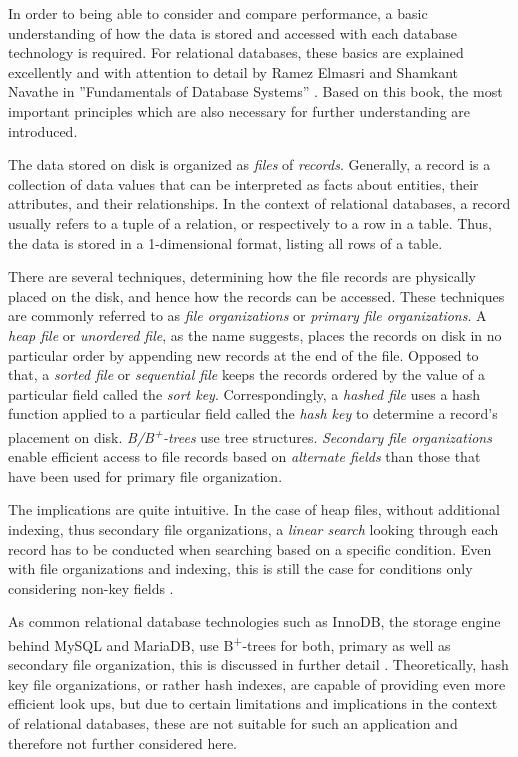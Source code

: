 In order to being able to consider and compare performance, a basic understanding of how the data is stored and accessed with each database technology is required. For relational databases, these basics are explained excellently and with attention to detail by Ramez Elmasri and Shamkant Navathe in ''Fundamentals of Database Systems'' \cite{DatabaseFundamentals}. Based on this book, the most important principles which are also necessary for further understanding are introduced.\par
The data stored on disk is organized as \emph{files} of \emph{records}. Generally, a record is a collection of data values that can be interpreted as facts about entities, their attributes, and their relationships. In the context of relational databases, a record usually refers to a tuple of a relation, or respectively to a row in a table. Thus, the data is stored in a 1-dimensional format, listing all rows of a table.\par
There are several techniques, determining how the file records are physically placed on the disk, and hence how the records can be accessed. These techniques are commonly referred to as \emph{file organizations} or \emph{primary file organizations}. A \emph{heap file} or \emph{unordered file}, as the name suggests, places the records on disk in no particular order by appending new records at the end of the file. Opposed to that, a \emph{sorted file} or \emph{sequential file} keeps the records ordered by the value of a particular field called the \emph{sort key}. Correspondingly, a \emph{hashed file} uses a hash function applied to a particular field called the \emph{hash key} to determine a record's placement on disk. \emph{B/B\textsuperscript{+}-trees} use tree structures. \emph{Secondary file organizations} enable efficient access to file records based on \emph{alternate fields} than those that have been used for primary file organization.\par
The implications are quite intuitive. In the case of heap files, without additional indexing, thus secondary file organizations, a \emph{linear search} looking through each record has to be conducted when searching based on a specific condition. Even with file organizations and indexing, this is still the case for conditions only considering non-key fields \cite{DatabaseFundamentals}.\par
As common relational database technologies such as InnoDB, the storage engine behind MySQL and MariaDB, use B\textsuperscript{+}-trees for both, primary as well as secondary file organization, this is discussed in further detail \cite{InnoDB}. Theoretically, hash key file organizations, or rather hash indexes, are capable of providing even more efficient look ups, but due to certain limitations and implications in the context of relational databases, these are not suitable for such an application and therefore not further considered here.

